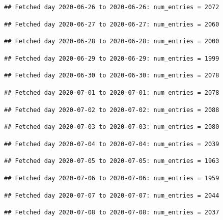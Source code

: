 \documentclass[]{article}
\begin{document}
\begin{verbatim}
## Fetched day 2020-06-26 to 2020-06-26: num_entries = 2072
\end{verbatim}

\begin{verbatim}
## Fetched day 2020-06-27 to 2020-06-27: num_entries = 2060
\end{verbatim}

\begin{verbatim}
## Fetched day 2020-06-28 to 2020-06-28: num_entries = 2000
\end{verbatim}

\begin{verbatim}
## Fetched day 2020-06-29 to 2020-06-29: num_entries = 1999
\end{verbatim}

\begin{verbatim}
## Fetched day 2020-06-30 to 2020-06-30: num_entries = 2078
\end{verbatim}

\begin{verbatim}
## Fetched day 2020-07-01 to 2020-07-01: num_entries = 2078
\end{verbatim}

\begin{verbatim}
## Fetched day 2020-07-02 to 2020-07-02: num_entries = 2088
\end{verbatim}

\begin{verbatim}
## Fetched day 2020-07-03 to 2020-07-03: num_entries = 2080
\end{verbatim}

\begin{verbatim}
## Fetched day 2020-07-04 to 2020-07-04: num_entries = 2039
\end{verbatim}

\begin{verbatim}
## Fetched day 2020-07-05 to 2020-07-05: num_entries = 1963
\end{verbatim}

\begin{verbatim}
## Fetched day 2020-07-06 to 2020-07-06: num_entries = 1959
\end{verbatim}

\begin{verbatim}
## Fetched day 2020-07-07 to 2020-07-07: num_entries = 2044
\end{verbatim}

\begin{verbatim}
## Fetched day 2020-07-08 to 2020-07-08: num_entries = 2037
\end{verbatim}
\end{document}
